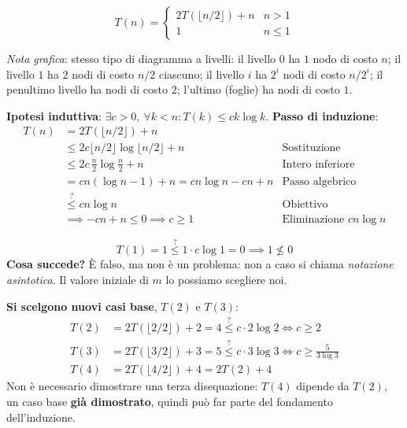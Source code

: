 \documentclass[12pt, a4paper]{article}
\begin{document}
$$T(n) = \begin{cases} 2T(\lfloor n/2\rfloor)+n & n>1 \\ 1 & n\le 1 \end{cases}$$

\textit{Nota grafica}: stesso tipo di diagramma a livelli: il livello $0$ ha $1$ nodo di costo $n$; il livello $1$ ha $2$ nodi di costo $n/2$ ciascuno; il livello $i$ ha $2^i$ nodi di costo $n/2^i$; il penultimo livello ha nodi di costo $2$; l'ultimo (foglie) ha nodi di costo $1$.

\begin{tcolorbox}[colback=lightergray!10, colframe=tocsec, title=\textbf{Tentativo: $T(n)=O(n\log n)$}]
\textbf{Ipotesi induttiva}: $\exists c>0,\ \forall k<n: T(k)\le ck\log k$. \textbf{Passo di induzione}:
\begin{align*}
T(n) &= 2T(\lfloor n/2\rfloor)+n \\
     &\le 2c\lfloor n/2\rfloor\log\lfloor n/2\rfloor + n & \text{Sostituzione} \\
     &\le 2c\,\frac{n}{2}\log\frac{n}{2} + n & \text{Intero inferiore} \\
     &= cn(\log n - 1)+n = cn\log n - cn + n & \text{Passo algebrico} \\
     &\overset{?}{\le} cn\log n & \text{Obiettivo} \\
     &\implies -cn+n\le 0 \implies c\ge 1 & \text{Eliminazione } cn\log n
\end{align*}
\end{tcolorbox}

\begin{tcolorbox}[colback=lightergray!5, colframe=tocsubsec, title=\textbf{Il Caso Base Fallisce -- e Non è un Problema}]
$$T(1)=1 \overset{?}{\le} 1\cdot c\log 1 = 0 \implies 1\not\le 0$$
\textbf{Cosa succede?} È falso, ma non è un problema: non a caso si chiama \emph{notazione asintotica}. Il valore iniziale di $m$ lo possiamo scegliere noi.
\end{tcolorbox}

\textbf{Si scelgono nuovi casi base}, $T(2)$ e $T(3)$:
\begin{align*}
T(2) &= 2T(\lfloor 2/2\rfloor)+2 = 4 \overset{?}{\le} c\cdot 2\log 2 \iff c\ge 2 \\
T(3) &= 2T(\lfloor 3/2\rfloor)+3 = 5 \overset{?}{\le} c\cdot 3\log 3 \iff c\ge \frac{5}{3\log 3} \\
T(4) &= 2T(\lfloor 4/2\rfloor)+4 = 2T(2)+4
\end{align*}
Non è necessario dimostrare una terza disequazione: $T(4)$ dipende da $T(2)$, un caso base \textbf{già dimostrato}, quindi può far parte del fondamento dell'induzione.
\end{document}

